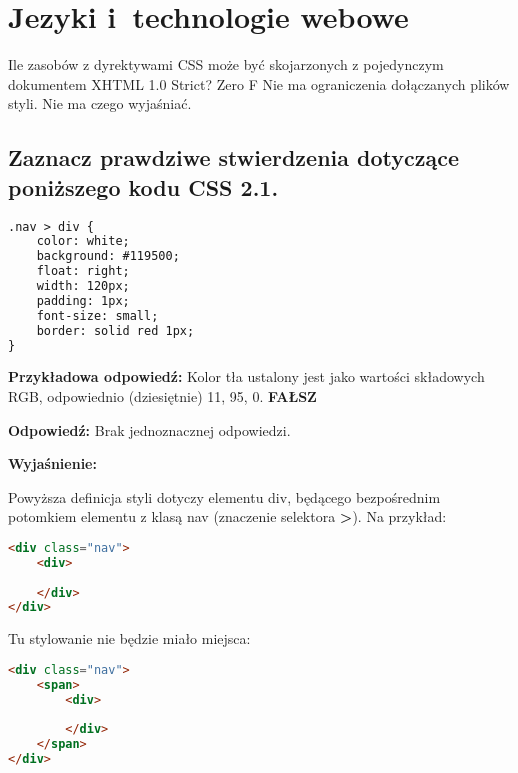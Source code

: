\chapter{Jezyki i~technologie webowe}
\PartialToc

\answer
{Ile zasobów z dyrektywami CSS może być skojarzonych z pojedynczym dokumentem XHTML 1.0 Strict?}
{Zero}
{F}
{Nie ma ograniczenia dołączanych plików styli.}
{Nie ma czego wyjaśniać.}


\section{Zaznacz prawdziwe stwierdzenia dotyczące poniższego kodu CSS 2.1.}
\begin{lstlisting}[language=html]
.nav > div {
	color: white;
	background: #119500;
	float: right;
	width: 120px;
	padding: 1px;
	font-size: small;
	border: solid red 1px;
}
\end{lstlisting}

\noindent
{\textbf{Przykładowa odpowiedź:}}
Kolor tła ustalony jest jako wartości składowych RGB, odpowiednio (dziesiętnie) 11, 95, 0.
\textbf{FAŁSZ}

\vspace{0.4cm}
\noindent
\textbf{Odpowiedź:}
Brak jednoznacznej odpowiedzi.

\vspace{0.4cm}
\noindent
\textbf{Wyjaśnienie:}

Powyższa definicja styli dotyczy elementu div, będącego bezpośrednim potomkiem elementu z klasą nav (znaczenie selektora \textbf{>}).
Na przykład:
\begin{lstlisting}[language=html]
<div class="nav">
	<div>
		
	</div>
</div>
\end{lstlisting}

Tu stylowanie nie będzie miało miejsca:

\begin{lstlisting}[language=html]
<div class="nav">
	<span>
		<div>
		
		</div>
	</span>
</div>
\end{lstlisting}


